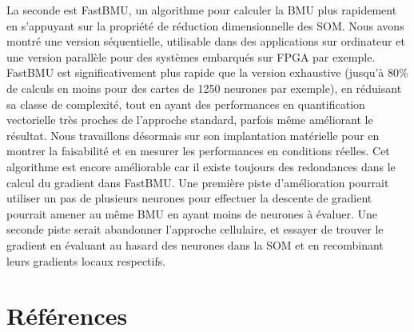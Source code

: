 La seconde est FastBMU, un algorithme pour calculer la BMU plus rapidement en s’appuyant sur la propriété de réduction dimensionnelle des SOM. Nous avons montré une version séquentielle, utilisable dans des applications sur ordinateur et une version parallèle pour des systèmes embarqués sur FPGA par exemple. FastBMU est significativement plus rapide que la version exhaustive (jusqu'à 80\% de calculs en moins pour des cartes de 1250 neurones par exemple), en réduisant sa classe de complexité, tout en ayant des performances en quantification vectorielle très proches de l’approche standard, parfois même améliorant le résultat. Nous travaillons désormais sur son implantation matérielle pour en montrer la faisabilité et en mesurer les performances en conditions réelles. Cet algorithme est encore améliorable car il existe toujours des redondances dans le calcul du gradient dans FastBMU. Une première piste d'amélioration pourrait utiliser un pas de plusieurs neurones pour effectuer la descente de gradient pourrait amener au même BMU en ayant moins de neurones à évaluer. Une seconde piste serait abandonner l'approche cellulaire, et essayer de trouver le gradient en évaluant au hasard des neurones dans la SOM et en recombinant leurs gradients locaux respectifs.


\section*{Références}

\renewcommand{\section}[2]{}%
